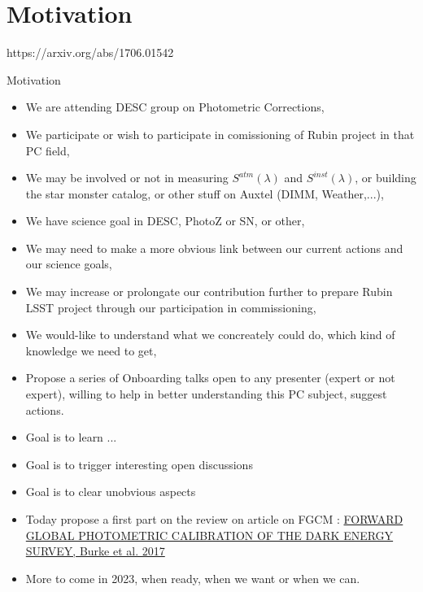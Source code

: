 \documentclass{beamer}
\begin{document}
\section{Motivation}
https://arxiv.org/abs/1706.01542
\begin{frame}\sectionpage\end{frame}


\begin{frame}{Motivation}
\begin{itemize}
\item We are attending DESC group on Photometric Corrections,
\item We participate or wish to participate in comissioning of Rubin project in that PC field, 
\item We may be involved or not in measuring $S^{atm}(\lambda)$ and $S^{inst}(\lambda)$, or building the star monster catalog, or other stuff on Auxtel (DIMM, Weather,...),
\item We have science goal in DESC, PhotoZ or SN, or other,
\item We may need to make a more obvious link between our current actions and our science goals,
\item We may increase or prolongate our contribution further to prepare Rubin LSST project through our participation in commissioning,
\item We would-like to understand what we concreately could do, which kind of knowledge we need to get,
\end{itemize}
\end{frame}

\begin{frame}
\begin{itemize}
\item Propose a series of Onboarding talks open to any presenter (expert or not expert), willing to help in better understanding this PC subject, suggest actions.
\item Goal is to learn ...
\item Goal is to trigger interesting open discussions
\item Goal is to clear unobvious aspects
\item Today propose a first part on the review on article on FGCM : \href{https://arxiv.org/abs/1706.01542}{FORWARD GLOBAL PHOTOMETRIC CALIBRATION OF THE DARK ENERGY SURVEY, Burke et al. 2017}
\item More to come in 2023, when ready, when we want or when we can.
\end{itemize}
\end{frame}
\end{document}
